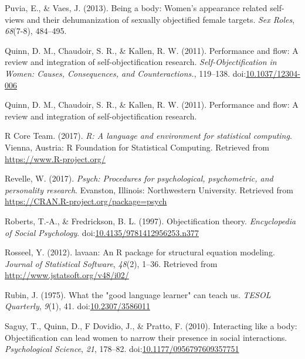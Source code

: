 \documentclass[
  man]{apa6}
\begin{document}
\leavevmode\hypertarget{ref-puvia2013being}{}%
Puvia, E., \& Vaes, J. (2013). Being a body: Women's appearance related self-views and their dehumanization of sexually objectified female targets. \emph{Sex Roles}, \emph{68}(7-8), 484--495.

\leavevmode\hypertarget{ref-quinnetal}{}%
Quinn, D. M., Chaudoir, S. R., \& Kallen, R. W. (2011). Performance and flow: A review and integration of self-objectification research. \emph{Self-Objectification in Women: Causes, Consequences, and Counteractions.}, 119--138. doi:\href{https://doi.org/10.1037/12304-006}{10.1037/12304-006}

\leavevmode\hypertarget{ref-quinn2011performance}{}%
Quinn, D. M., Chaudoir, S. R., \& Kallen, R. W. (2011). Performance and flow: A review and integration of self-objectification research.

\leavevmode\hypertarget{ref-R-base}{}%
R Core Team. (2017). \emph{R: A language and environment for statistical computing}. Vienna, Austria: R Foundation for Statistical Computing. Retrieved from \url{https://www.R-project.org/}

\leavevmode\hypertarget{ref-R-psych}{}%
Revelle, W. (2017). \emph{Psych: Procedures for psychological, psychometric, and personality research}. Evanston, Illinois: Northwestern University. Retrieved from \url{https://CRAN.R-project.org/package=psych}

\leavevmode\hypertarget{ref-robertsfredrickson}{}%
Roberts, T.-A., \& Fredrickson, B. L. (1997). Objectification theory. \emph{Encyclopedia of Social Psychology}. doi:\href{https://doi.org/10.4135/9781412956253.n377}{10.4135/9781412956253.n377}

\leavevmode\hypertarget{ref-R-lavaan}{}%
Rosseel, Y. (2012). lavaan: An R package for structural equation modeling. \emph{Journal of Statistical Software}, \emph{48}(2), 1--36. Retrieved from \url{http://www.jstatsoft.org/v48/i02/}

\leavevmode\hypertarget{ref-rubin1975}{}%
Rubin, J. (1975). What the "good language learner" can teach us. \emph{TESOL Quarterly}, \emph{9}(1), 41. doi:\href{https://doi.org/10.2307/3586011}{10.2307/3586011}

\leavevmode\hypertarget{ref-saguyetal2010}{}%
Saguy, T., Quinn, D., F Dovidio, J., \& Pratto, F. (2010). Interacting like a body: Objectification can lead women to narrow their presence in social interactions. \emph{Psychological Science}, \emph{21}, 178--82. doi:\href{https://doi.org/10.1177/0956797609357751}{10.1177/0956797609357751}
\end{document}
